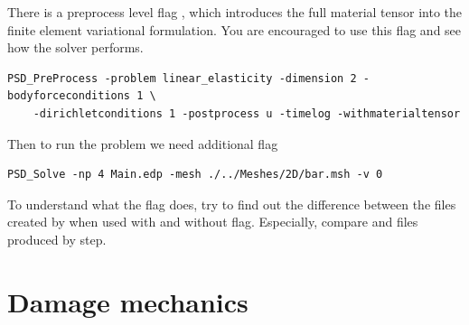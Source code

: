 {{There is a preprocess level flag , which introduces the full material tensor into the finite element variational formulation. You are encouraged to use this flag and see how the solver performs.

\begin{lstlisting}[style=BashInputStyle]
	PSD_PreProcess -problem linear_elasticity -dimension 2 -bodyforceconditions 1 \
	-dirichletconditions 1 -postprocess u -timelog -withmaterialtensor
\end{lstlisting}

Then to run the problem we need additional  flag

\begin{lstlisting}[style=BashInputStyle]
	PSD_Solve -np 4 Main.edp -mesh ./../Meshes/2D/bar.msh -v 0
\end{lstlisting}

To understand what the flag does, try to find out the difference between the files created by  when used with and without   flag. Especially, compare   and  files produced by  step.


\pagebreak













\section{Damage mechanics}
}}
